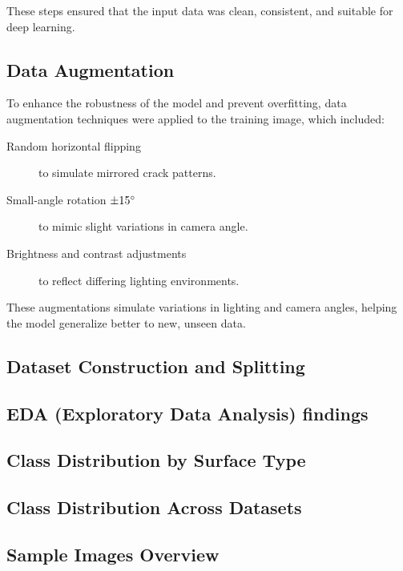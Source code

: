 These steps ensured that the input data was clean, consistent, and suitable for deep learning.

\subsection{Data Augmentation}

To enhance the robustness of the model and prevent overfitting, data augmentation techniques were applied to the training image, which included:

\begin{description}
	\item[Random horizontal flipping] to simulate mirrored crack patterns.
	\item[Small-angle rotation $\pm 15\degree$] to mimic slight variations in camera angle.
	\item[Brightness and contrast adjustments] to reflect differing lighting environments.
\end{description}

These augmentations simulate variations in lighting and camera angles, helping the model generalize better to new, unseen data.

\subsection{Dataset Construction and Splitting}

\subsection{EDA (Exploratory Data Analysis) findings}

\subsection{Class Distribution by Surface Type}

\subsection{Class Distribution Across Datasets}

\subsection{Sample Images Overview}

\clearpage
